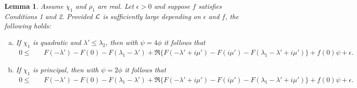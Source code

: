 \documentclass[12pt,psamsfonts]{amsart}
\newtheorem{lem}[thm]{Lemma}
\theoremstyle{definition}
\theoremstyle{remark}
\numberwithin{equation}{section}
\begin{document}
\begin{lem} \label{SZ-L1LpIdentity} Assume $\chi_1$ and $\rho_1$ are real. Let $\epsilon > 0$ and suppose $f$ satisfies Conditions 1 and 2. Provided $\mathcal{L}$ is sufficiently large depending on $\epsilon$ and $f$, the following holds:

\begin{enumerate}[(a)]

	\item If $\chi_1$ is quadratic and $\lambda' \leq \lambda_2$, then with $\psi = 4\phi$ it follows that
		\begin{align*}
0 \leq & \quad F(-\lambda')  - F(0) - F(\lambda_1-\lambda') + \Re\{ F(-\lambda'+i\mu') - F(i\mu') - F(\lambda_1-\lambda'+i\mu') \} + f(0)\psi+\epsilon.
\end{align*}

	\item If $\chi_1$ is principal, then with $\psi = 2\phi$ it follows that
	\	\begin{align*}
0 \leq & \quad F(-\lambda')  - F(0) - F(\lambda_1-\lambda')  + \Re\{ F(-\lambda'+i\mu')  - F(i\mu')  - F(\lambda_1-\lambda'+i\mu')\}  + f(0)\psi+\epsilon.
\end{align*}
\end{enumerate}
\end{lem}
\end{document}

